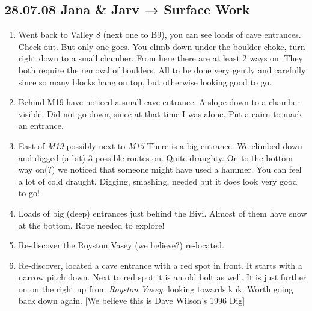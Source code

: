 \hypertarget{jana-jarv-surface-work}{%
\subsection{28.07.08 Jana \& Jarv → Surface
Work}\label{jana-jarv-surface-work}}

\begin{enumerate}
\def\labelenumi{\arabic{enumi}.}
\tightlist
\item
  Went back to Valley 8 (next one to B9), you can see loads of cave
  entrances. Check out. But only one goes. You climb down under the
  boulder choke, turn right down to a small chamber. From here there are
  at least 2 ways on. They both require the removal of boulders. All to
  be done very gently and carefully since so many blocks hang on top,
  but otherwise looking good to go.
\item
  Behind M19 have noticed a small cave entrance. A slope down to a
  chamber visible. Did not go down, since at that time I was alone. Put
  a cairn to mark an entrance.
\item
  East of \emph{M19} possibly next to \emph{M15} There is a big
  entrance. We climbed down and digged (a bit) 3 possible routes on.
  Quite draughty. On to the bottom way on(?) we noticed that someone
  might have used a hammer. You can feel a lot of cold draught. Digging,
  smashing, needed but it does look very good to go!
\item
  Loads of big (deep) entrances just behind the Bivi. Almost of them
  have snow at the bottom. Rope needed to explore!
\item
  Re-discover the Royston Vasey (we believe?) re-located.
\item
  Re-discover, located a cave entrance with a red spot in front. It
  starts with a narrow pitch down. Next to red spot it is an old bolt as
  well. It is just further on on the right up from \emph{Royston Vasey},
  looking towards kuk. Worth going back down again. {[}We believe this
  is Dave Wilson's 1996 Dig{]}
\end{enumerate}



